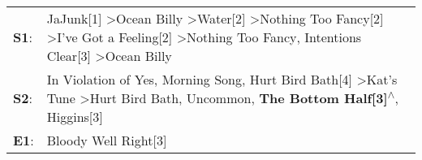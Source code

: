 \begin{supertabular}{p{0.03\textwidth}p{0.92\textwidth}}
 \textbf{S1}:  &  JaJunk[1]\textsuperscript{} \textgreater \enspace Ocean Billy\textsuperscript{} \textgreater \enspace Water[2]\textsuperscript{} \textgreater \enspace Nothing Too Fancy[2]\textsuperscript{} \textgreater \enspace I've Got a Feeling[2]\textsuperscript{} \textgreater \enspace Nothing Too Fancy\textsuperscript{}, \enspace Intentions Clear[3]\textsuperscript{} \textgreater \enspace Ocean Billy\textsuperscript{}  \enspace  \\
 \textbf{S2}:  &                                         In Violation of Yes\textsuperscript{}, \enspace Morning Song\textsuperscript{}, \enspace Hurt Bird Bath[4]\textsuperscript{} \textgreater \enspace Kat's Tune\textsuperscript{} \textgreater \enspace Hurt Bird Bath\textsuperscript{}, \enspace Uncommon\textsuperscript{}, \enspace \textbf{The Bottom Half[3]\textsuperscript{$\wedge$}}, \enspace Higgins[3]\textsuperscript{}  \enspace  \\
 \textbf{E1}:  &                                                                                                                                                                                                                                                                                                                                                                                     Bloody Well Right[3]\textsuperscript{}  \enspace  \\
\end{supertabular}
